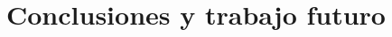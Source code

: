 \documentclass[a4paper,11pt]{book}
\begin{document}
\chapter{Conclusiones y trabajo futuro}





\end{document}
